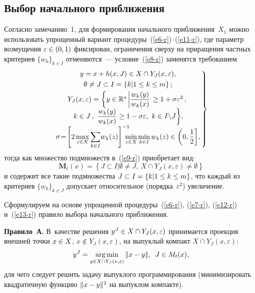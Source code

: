 \begin{multicols}{2}
\section{Выбор начального приближения}

  Согласно замечанию~1, для формирования начального 
приближения~$X_1$ можно использовать упрощенный вариант 
процедуры~(\ref{e6-r})--(\ref{e11-r}), где параметр возмущения 
$\varepsilon\hm\in (0,1)$ фиксирован, ограничения сверху на приращения 
частных критериев $\{w_k\}_{k\in I}$ отменяются~--- условие~(\ref{e8-r}) 
заменятся требованием
  \begin{equation}
  \left.
  \begin{array}{c}
 \!\! \!\!\!\! y=x+h(x,J) \in X \cap Y_J(x,\varepsilon),\\[3pt]
  \!\! \!\!\!\! \emptyset \not= J\subset I= \{k\vert 1\leq k\leq m\}\,;\\[3pt]
  \!\! \!\!\!\!Y_J(x,\varepsilon) =\left\{ y\in \mathbb{R}^s\left\vert 
\fr{w_k(y)}{w_k(x)}\right. \geq 1+\sigma\varepsilon^2\,,\right.\\[3pt]
 \!\!  \!\!\!\!\left. k\in J\,,\ \fr{w_k(y)}{w_k(x)}\geq 1-\sigma\varepsilon,\ k\in I\backslash 
J\right\}\!,\\[3pt]
 \!\!\!\!\!\! \sigma\!=\! \left[ 2\max\limits_{z\in X}\displaystyle \sum\limits_{k\in I}\! w_k(z)\right]^{-1}
  \!\!\!\!\!\min\limits_{z\in X} \min\limits_{k\in I} w_k(z)\in \left(0, \fr{1}{2}\right]\!,
  \end{array}\!\!
  \right\}\!\!\!
  \label{e12-r}
  \end{equation}
тогда как множество подмножеств в~(\ref{e9-r}) приобретает вид:
\begin{equation}
\mathbf{M}_t(x)=\left\{ J\subset I\vert \emptyset \not= J,\ X\cap 
Y_J(x,\varepsilon)\not= \emptyset\right\}
\label{e13-r}
\end{equation}
и содержит все такие подмножества $J\hm\subset I\hm= \{ k\vert 1\hm\leq 
k\hm\leq m\}$, что каждый из критериев $\{ w_k\}_{k\in J}$ допускает 
относительное (порядка~$\varepsilon^2$) увеличение.
  
  Сформулируем на основе упрощенной процедуры~(\ref{e6-r}), (\ref{e7-r}), 
(\ref{e12-r}) и~(\ref{e13-r}) правило выбора начального приближения.
  
  \smallskip
  
  \noindent
  \textbf{Правило~А.} В~качестве решения $y^J\hm\in X\cap 
Y_J(x,\varepsilon)$ принимается проекция внешней точки $x\hm\in X$, 
$x\not\in Y_J(x,\varepsilon)$, на выпуклый компакт $X\cap Y_J(x,\varepsilon)$:
  \begin{equation}
  y^J=\mathop{\mathrm{arg}\,\mathrm{min}}\limits_{y\in X\cap Y_J(x,\varepsilon)} \| x-y\|,\enskip J\in M_t(x),
  \label{e14-r}
  \end{equation}
для чего следует решить задачу выпуклого программирования 
(минимизировать квадратичную функцию $\| x\hm- y\|^2$ на выпуклом 
компакте).


\end{multicols}
